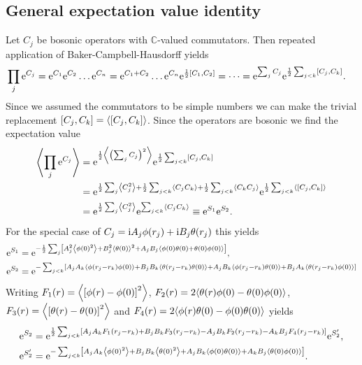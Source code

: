\documentclass[english, parskip=full]{scrartcl}
\begin{document}
\subsection{General expectation value identity}
Let $C_j$ be bosonic operators with $\mathbb{C}$-valued commutators.
Then repeated application of Baker-Campbell-Hausdorff yields
\begin{align}
\prod_j \powe{C_j} &= \powe{C_1} \powe{C_2} \dots \powe{C_n} = \powe{C_1+C_2}\dots \powe{C_n} \powe{\frac{1}{2} \klb*{C_1,C_2}} = \dots = \powe{\sum_j C_j} \powe{\frac{1}{2} \sum_{j<k} \klb*{C_j,C_k}}.
\end{align}
Since we assumed the commutators to be simple numbers we can make the trivial replacement $\klb*{C_j,C_k} = \bra*{\klb*{C_j,C_k}}$.
Since the operators are bosonic we find the expectation value
\begin{align}
\bra*{\prod_j \powe{C_j}} &= \powe{\frac{1}{2} \bra*{\kla*{\sum_j C_j}^2}} \powe{\frac{1}{2} \sum_{j<k} \klb*{C_j,C_k}}\\
&= \powe{\frac{1}{2} \sum_j \bra*{C_j^2} + \frac{1}{2} \sum_{j<k} \bra*{C_jC_k} + \frac{1}{2} \sum_{j<k} \bra*{C_kC_j}} \powe{\frac{1}{2} \sum_{j<k} \bra*{\klb*{C_j,C_k}}}\\
&= \powe{\frac{1}{2} \sum_j \bra*{C_j^2}} \powe{\sum_{j<k} \bra*{C_jC_k}} \equiv \powe{S_1} \powe{S_2}.
\end{align}
For the special case of $C_j = \i A_j\phi(r_j) + \i B_j \theta(r_j)$ this yields
\begin{align}
\powe{S_1} &= \powe{-\frac{1}{2} \sum_j \klb*{A_j^2 \bra*{\phi(0)^2} + B_j^2 \bra*{\theta(0)}^2 + A_jB_j \bra*{\phi(0)\theta(0) + \theta(0)\phi(0)}}},\\
\powe{S_2} &= \powe{-\sum_{j<k} \klb*{A_jA_k \bra*{\phi(r_j-r_k)\phi(0)} + B_jB_k \bra*{\theta(r_j-r_k)\theta(0)} + A_jB_k \bra*{\phi(r_j-r_k)\theta(0)} + B_jA_k \bra*{\theta(r_j-r_k)\phi(0)}}}
\end{align}
Writing $F_1(r) = \bra*{\klb*{\phi(r) - \phi(0)}^2}$, $F_2(r) = 2\bra*{\theta(r)\phi(0) - \theta(0)\phi(0)}$, $F_3(r) = \bra*{\klb*{\theta(r) - \theta(0)}^2}$ and $F_4(r) = 2\bra*{\phi(r)\theta(0) - \phi(0)\theta(0)}$ yields
\begin{align}
\powe{S_2} &= \powe{\frac{1}{2} \sum_{j<k} \klb*{A_jA_k F_1(r_j-r_k) + B_jB_kF_3(r_j-r_k) - A_jB_k F_2(r_j-r_k) - A_kB_j F_4(r_j-r_k)}} \powe{S_2'},\\
\powe{S_2'} &= \powe{-\sum_{j<k} \klb*{A_jA_k \bra*{\phi(0)^2} + B_jB_k \bra*{\theta(0)^2} + A_jB_k \bra*{\phi(0)\theta(0)} + A_kB_j \bra*{\theta(0)\phi(0)}}}.
\end{align}
\end{document}
